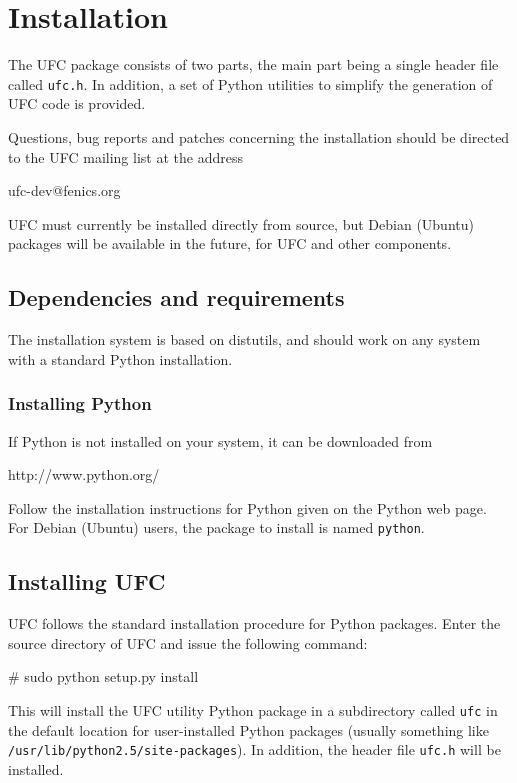 \chapter{Installation}
\label{app:installation}

\newcommand{\ufc}{UFC}

The \ufc{} package consists of two parts, the main part being a single
header file called \texttt{ufc.h}. In addition, a set of Python
utilities to simplify the generation of \ufc{} code is provided.

Questions, bug reports and patches concerning the installation should
be directed to the \ufc{} mailing list at the address
\begin{code}
ufc-dev@fenics.org
\end{code}

\ufc{} must currently be installed directly from source, but Debian
(Ubuntu) packages will be available in the future, for \ufc{} and
other \fenics{} components.

\section{Dependencies and requirements}

The installation system is based on distutils, and should work on any
system with a standard Python installation.

\subsection{Installing Python}

If Python is not installed on your system, it can be downloaded from
\begin{code}
http://www.python.org/
\end{code}
Follow the installation instructions for Python given on the Python
web page.  For Debian (Ubuntu) users, the package to install is named
\texttt{python}.

\section{Installing \ufc{}}

\ufc{} follows the standard installation procedure for Python
packages. Enter the source directory of \ufc{} and issue the following
command:
\begin{code}
# sudo python setup.py install
\end{code}
This will install the \ufc{} utility Python package in a subdirectory
called \texttt{ufc} in the default location for user-installed Python
packages (usually something like
\texttt{/usr/lib/python2.5/site-packages}). In addition, the header
file \texttt{ufc.h} will be installed.

